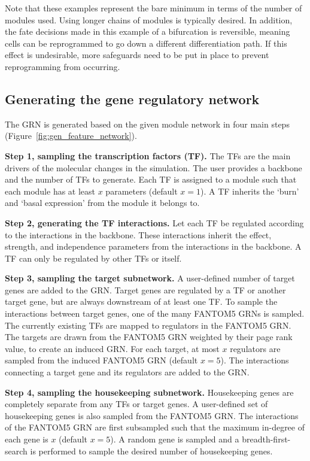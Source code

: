 \documentclass[
  table,
  10pt,
  a4paper]{article}
\begin{document}
Note that these examples represent the bare minimum in terms of the
number of modules used. Using longer chains of modules is typically
desired. In addition, the fate decisions made in this example of a
bifurcation is reversible, meaning cells can be reprogrammed to go down
a different differentiation path. If this effect is undesirable, more
safeguards need to be put in place to prevent reprogramming from
occurring.

\hypertarget{sec:dyngen-grn}{%
\subsection{Generating the gene regulatory
network}\label{sec:dyngen-grn}}

The GRN is generated based on the given module network in four main
steps (Figure~\ref{fig:gen_feature_network}).

\textbf{Step 1, sampling the transcription factors (TF).} The TFs are
the main drivers of the molecular changes in the simulation. The user
provides a backbone and the number of TFs to generate. Each TF is
assigned to a module such that each module has at least \(x\) parameters
(default \(x=1\)). A TF inherits the `burn' and `basal expression' from
the module it belongs to.

\textbf{Step 2, generating the TF interactions.} Let each TF be
regulated according to the interactions in the backbone. These
interactions inherit the effect, strength, and independence parameters
from the interactions in the backbone. A TF can only be regulated by
other TFs or itself.

\textbf{Step 3, sampling the target subnetwork.} A user-defined number
of target genes are added to the GRN. Target genes are regulated by a TF
or another target gene, but are always downstream of at least one TF. To
sample the interactions between target genes, one of the many FANTOM5
\cite{lizio_gatewaysfantom5promoter_2015} GRNs is sampled. The currently
existing TFs are mapped to regulators in the FANTOM5 GRN. The targets
are drawn from the FANTOM5 GRN weighted by their page rank value, to
create an induced GRN. For each target, at most \(x\) regulators are
sampled from the induced FANTOM5 GRN (default \(x=5\)). The interactions
connecting a target gene and its regulators are added to the GRN.

\textbf{Step 4, sampling the housekeeping subnetwork.} Housekeeping
genes are completely separate from any TFs or target genes. A
user-defined set of housekeeping genes is also sampled from the FANTOM5
GRN. The interactions of the FANTOM5 GRN are first subsampled such that
the maximum in-degree of each gene is \(x\) (default \(x=5\)). A random
gene is sampled and a breadth-first-search is performed to sample the
desired number of housekeeping genes.
\end{document}
